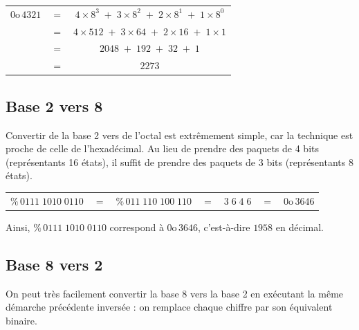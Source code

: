 \documentclass[11pt,a4paper]{article}
\begin{document}
\begin{tabular}{l c c}
$ 0\text{o} \, 4321 $  &  $ = $  &  $ 4 \times 8^3 \; + \; 3 \times 8^2 \; + \; 2 \times 8^1 \; + \; 1 \times 8^0 $ \\
  &  $ = $  &  $ 4 \times 512 \; + \; 3 \times 64 \; + \; 2 \times 16 \; + \; 1 \times 1 $ \\
  &  $ = $  &  $ 2048 \; + \; 192 \; + \; 32 \; + \; 1 $ \\
  &  $ = $  &  $ 2273 $ \\
\end{tabular}

\bigskip


\subsection{Base 2 vers 8}

\bigskip

Convertir de la base 2 vers de l'octal est extrêmement simple, car la technique est proche de celle de l'hexadécimal.
Au lieu de prendre des paquets de 4 bits (représentants 16 états), il suffit de prendre des paquets de 3 bits (représentants 8 états).

\bigskip

\begin{tabular}{l c c c c c c}
$ \% \, 0111 \; 1010 \; 0110 $  &  $ = $  & $ \% \, 011 \; 110 \; 100 \; 110 $  &  $ = $  & $ 3 \; 6 \; 4 \; 6 $ & $ = $ & $ 0\text{o} \, 3646 $ \\
\end{tabular}

\bigskip

Ainsi, $ \% \, 0111 \; 1010 \; 0110 $ correspond à $ 0\text{o} \, 3646 $, c'est-à-dire $ 1958 $ en décimal.

\bigskip


\subsection{Base 8 vers 2}

\bigskip

On peut très facilement convertir la base 8 vers la base 2 en exécutant la même démarche précédente inversée : on remplace chaque chiffre par son équivalent binaire.

\bigskip
\end{document}
